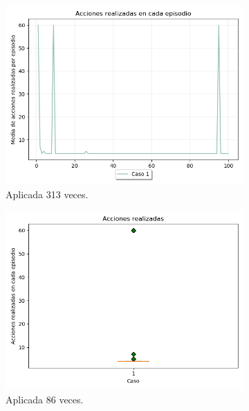 \begin{figure}
    \centering
    \begin{subfigure}{.6\textwidth}
        \centering
        \includegraphics[scale=0.35]{cap5_experimentacion/images/initial_acciones.png}
        \caption{Aplicada 313 veces.}
        \label{fig:initial_acciones}
    \end{subfigure}%
    \begin{subfigure}{.6\textwidth}
        \centering
        \includegraphics[scale=0.35]{cap5_experimentacion/images/initial_boxplot.png}
        \caption{Aplicada 86 veces.}
        \label{fig:initial_boxplot}
    \end{subfigure}
    \begin{subfigure}{.6\textwidth}

\end{subfigure}
\end{figure}

